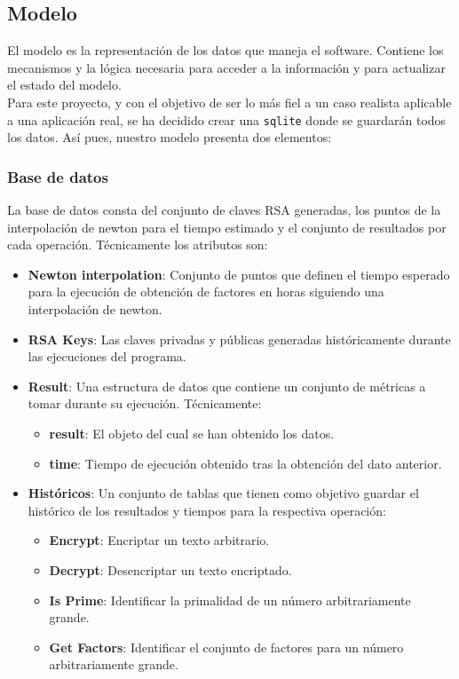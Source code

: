 \subsection{Modelo}

El modelo es la representación de los datos que maneja el software. Contiene los mecanismos y la lógica necesaria para acceder a la información y para actualizar el estado del modelo.\\

Para este proyecto, y con el objetivo de ser lo más fiel a un caso realista aplicable a una aplicación real, se ha decidido crear una \texttt{sqlite} donde se guardarán todos los datos. Así pues, nuestro modelo presenta dos elementos:

\subsubsection{Base de datos}
La base de datos consta del conjunto de claves RSA generadas, los puntos de la interpolación de newton para el tiempo estimado y el conjunto de resultados por cada operación. Técnicamente los atributos son:\\

\begin{itemize}
    \item \textbf{Newton interpolation}: Conjunto de puntos que definen el tiempo esperado para la ejecución de obtención de factores en horas siguiendo una interpolación de newton. 
    \item \textbf{RSA Keys}: Las claves privadas y públicas generadas históricamente durante las ejecuciones del programa.
    \item \textbf{Result}: Una estructura de datos que contiene un conjunto de métricas a tomar durante su ejecución. Técnicamente: \begin{itemize}
        \item \textbf{result}: El objeto del cual se han obtenido los datos.
        \item \textbf{time}: Tiempo de ejecución obtenido tras la obtención del dato anterior.
    \end{itemize}
    \item \textbf{Históricos}: Un conjunto de tablas que tienen como objetivo guardar el histórico de los resultados y tiempos para la respectiva operación:\begin{itemize}
        \item \textbf{Encrypt}: Encriptar un texto arbitrario.
        \item \textbf{Decrypt}: Desencriptar un texto encriptado.
        \item \textbf{Is Prime}: Identificar la primalidad de un número arbitrariamente grande.
        \item \textbf{Get Factors}: Identificar el conjunto de factores para un número arbitrariamente grande.
    \end{itemize}
\end{itemize}

